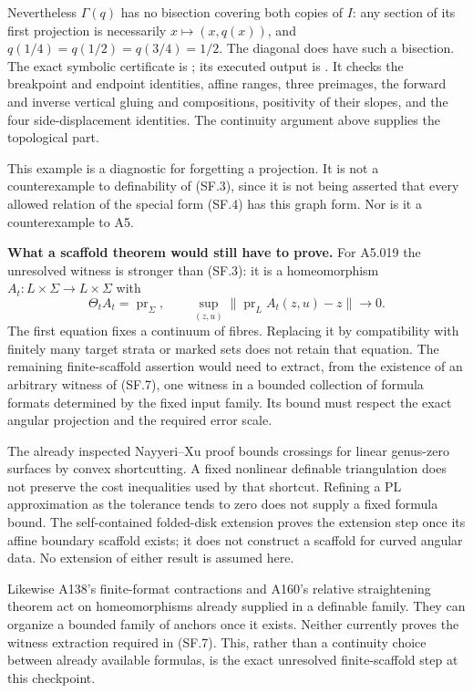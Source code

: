 Nevertheless $\Gamma(q)$ has no bisection covering both copies of $I$:
any section of its first projection is necessarily $x\mapsto(x,q(x))$,
and $q(1/4)=q(1/2)=q(3/4)=1/2$. The diagonal does have such a bisection.
The exact symbolic certificate is
;
its executed output is
.
It checks the breakpoint and endpoint identities, affine ranges, three
preimages, the forward and inverse vertical gluing and compositions,
positivity of their slopes, and the four side-displacement identities.
The continuity argument above supplies the topological part.

This example is a diagnostic for forgetting a projection. It is not a
counterexample to definability of (SF.3), since it is not being asserted
that every allowed relation of the special form (SF.4) has this graph
form. Nor is it a counterexample to A5.

\textbf{What a scaffold theorem would still have to prove.}
For A5.019 the unresolved witness is stronger than (SF.3): it is a
homeomorphism $A_t:L\times\Sigma\to L\times\Sigma$ with
\[
 \Theta_t A_t=\operatorname{pr}_{\Sigma},\qquad
 \sup_{(z,u)}\|\operatorname{pr}_L A_t(z,u)-z\|\longrightarrow0.
 \tag{SF.7}
\]
The first equation fixes a continuum of fibres. Replacing it by
compatibility with finitely many target strata or marked sets does not
retain that equation. The remaining finite-scaffold assertion would
need to extract, from the existence of an arbitrary witness of (SF.7),
one witness in a bounded collection of formula formats determined by
the fixed input family. Its bound must respect the exact angular
projection and the required error scale.

The already inspected Nayyeri--Xu proof bounds crossings for linear
genus-zero surfaces by convex shortcutting. A fixed nonlinear definable
triangulation does not preserve the cost inequalities used by that
shortcut. Refining a PL approximation as the tolerance tends to zero
does not supply a fixed formula bound. The self-contained folded-disk
extension proves the extension step once its affine boundary scaffold
exists; it does not construct a scaffold for curved angular data.
No extension of either result is assumed here.

Likewise A138's finite-format contractions and A160's relative
straightening theorem act on homeomorphisms already supplied in a
definable family. They can organize a bounded family of anchors once
it exists. Neither currently proves the witness extraction required in
(SF.7). This, rather than a continuity choice between already available
formulas, is the exact unresolved finite-scaffold step at this checkpoint.
